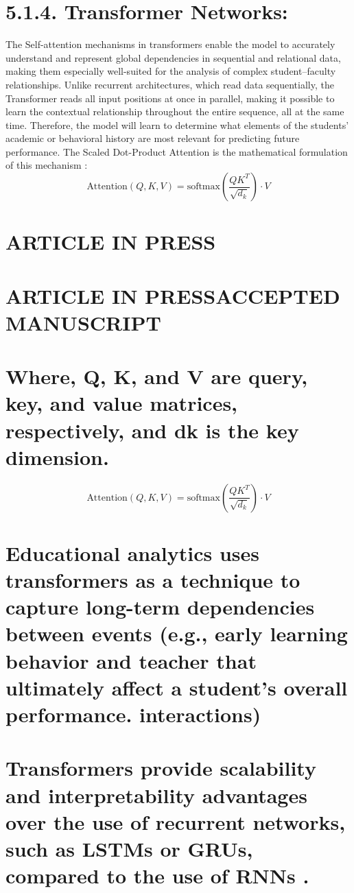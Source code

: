 \documentclass[twocolumn]{svjour3}
\begin{document}
\section{5.1.4. Transformer Networks:}
The Self-attention mechanisms in transformers enable the model to accurately understand and represent global dependencies in sequential and relational data, making them especially well-suited for the analysis of complex student–faculty relationships. Unlike recurrent architectures, which read data sequentially, the Transformer reads all input positions at once in parallel, making it possible to learn the contextual relationship throughout the entire sequence, all at the same time. Therefore, the model will learn to determine what elements of the students' academic or behavioral history are most relevant for predicting future performance. The Scaled Dot-Product Attention is the mathematical formulation of this mechanism \cite{23}:
\begin{equation}
\text{Attention}(Q,K,V) = \text{softmax}\left(\frac{QK^T}{\sqrt{d_k}}\right) \cdot V
\end{equation}
\section{ARTICLE IN PRESS}
\section{ARTICLE IN PRESSACCEPTED MANUSCRIPT}
\section{Where, Q, K, and V are query, key, and value matrices, respectively, and dk is the key dimension.}
\begin{equation}
\text{Attention}(Q,K,V) = \text{softmax}\left(\frac{QK^T}{\sqrt{d_k}}\right) \cdot V
\end{equation}
\section{Educational analytics uses transformers as a technique to capture long-term dependencies between events (e.g., early learning behavior and teacher that ultimately affect a student's overall performance. interactions)}
\section{Transformers provide scalability and interpretability advantages over the use of recurrent networks, such as LSTMs or GRUs, compared to the use of RNNs \cite{27}. }
\end{document}
